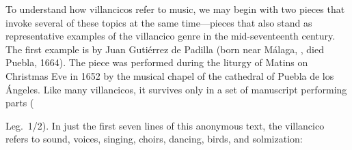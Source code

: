 To understand how villancicos refer to music, we may begin with two pieces that invoke several of these topics at the same time---pieces that also stand as representative examples of the villancico genre in the mid-seventeenth century.
The first example is  by Juan Gutiérrez de Padilla (born near Málaga, , died Puebla, 1664).
The piece was performed during the liturgy of Matins on Christmas Eve in 1652 by the musical chapel of the cathedral of Puebla de los Ángeles.
Like many villancicos, it survives only in a set of manuscript performing parts (\signature{MEX-Pc}{Leg.~1/2}).
In just the first seven lines of this anonymous text, the villancico refers to sound, voices, singing, choirs, dancing, birds, and solmization:

